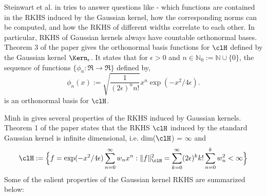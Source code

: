 Steinwart et al. in \cite{stehussco06} tries to answer questions like - which functions are contained in the RKHS induced by the Gaussian kernel, how the corresponding norms can be computed, and how the RKHS of different widths correlate to each other.
In particular, RKHS of Gaussian kernels always have countable orthonormal bases. Theorem 3 of the paper gives the orthonormal basis functions for $\clH$ defined by the Gaussian kernel $\Kern_\epsilon$. It states that for $\epsilon >0$ and $n \in \mathbb{N}_0 := \mathbb{N} \cup \{0\}$, the sequence of functions $\{\phi_n : \Re \to \Re\}$ defined by,
\begin{equation}
\phi_n(x) := \sqrt{\frac{1}{(2\epsilon)^n n!}}x^n \exp(-x^2/4\epsilon).
\end{equation}
is an orthonormal basis for $\clH$.

Minh in \cite{min10} gives several properties of the RKHS induced by Gaussian kernels. Theorem 1 of the paper states that the RKHS $\clH$ induced by the standard Gaussian kernel is infinite dimensional, i.e. dim($\clH$) = $\infty$ and 
\begin{equation}
\clH := \Bigl\{ f = \exp(-x^2/4\epsilon) \sum_{n=0}^\infty w_n x^n: \|f\|^2_\clH = \sum_{k=0}^\infty (2\epsilon)^k k! \sum_{n=0}^k w_n^2 <\infty \Bigr\}
\end{equation}
Some of the salient properties of the Gaussian kernel RKHS are summarized below: 
